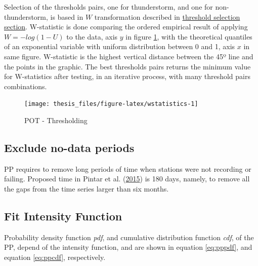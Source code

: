 \documentclass[12pt,oneside]{reedthesis}
\begin{document}
Selection of the thresholds pairs, one for thunderstorm, and one for non-thunderstorm, is based in \(W\) transformation described in \protect\hyperlink{thresholdselection}{threshold selection section}. W-statistic is done comparing the ordered empirical result of applying \(W = -log(1-U)\) to the data, axis \(y\) in figure \ref{fig:wstatistics}, with the theoretical quantiles of an exponential variable with uniform distribution between 0 and 1, axis \(x\) in same figure. W-statistic is the highest vertical distance between the 45º line and the points in the graphic. The best thresholds pairs returns the minimum value for W-statistics after testing, in an iterative process, with many threshold pairs combinations.

\footnotesize
\begin{figure}

{\centering \texttt{[image: thesis\_files/figure-latex/wstatistics-1]} 

}

\caption{POT - Thresholding}\label{fig:wstatistics}
\end{figure}
\normalsize

\hypertarget{exclude-no-data-periods}{%
\subsection{Exclude no-data periods}\label{exclude-no-data-periods}}

PP requires to remove long periods of time when stations were not recording or failing. Proposed time in Pintar et al. (\protect\hyperlink{ref-Pintar2015}{2015}) is 180 days, namely, to remove all the gaps from the time series larger than six months.

\hypertarget{fit-intensity-function}{%
\subsection{Fit Intensity Function}\label{fit-intensity-function}}

Probability density function \emph{pdf}, and cumulative distribution function \emph{cdf}, of the PP, depend of the intensity function, and are shown in equation \eqref{eq:pppdf}, and equation \eqref{eq:ppcdf}, respectively.
\end{document}
